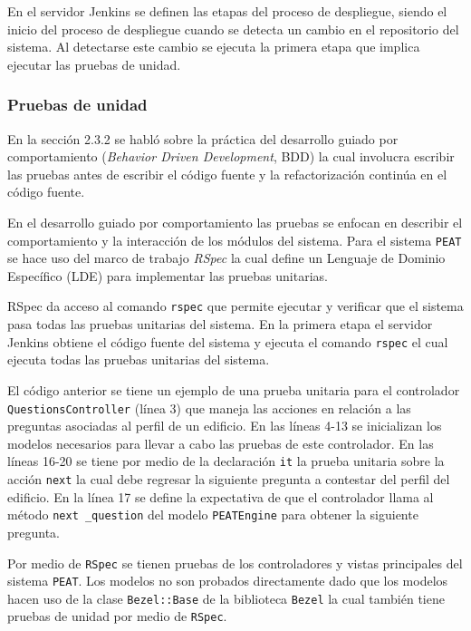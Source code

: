 En el servidor Jenkins se definen las etapas del proceso de despliegue, siendo
el inicio del proceso de despliegue cuando se detecta un cambio en el repositorio
del sistema. Al detectarse este cambio se ejecuta la primera etapa que implica
ejecutar las pruebas de unidad.

\subsubsection{Pruebas de unidad}

En la sección 2.3.2 se habló sobre la práctica del desarrollo guiado por
comportamiento (\textit{Behavior Driven Development}, BDD) la cual involucra
escribir las pruebas antes de escribir el código fuente y la refactorización
continúa en el código fuente.

En el desarrollo guiado por comportamiento las pruebas se enfocan en describir el
comportamiento y la interacción de los módulos del sistema. Para el sistema
\texttt{PEAT} se hace uso del marco de trabajo \textit{RSpec} la cual define un
Lenguaje de Dominio Específico (LDE) para implementar las pruebas unitarias.

RSpec da acceso al comando \texttt{rspec} que permite ejecutar y verificar
que el sistema pasa todas las pruebas unitarias del sistema. En la primera
etapa el servidor Jenkins obtiene el código fuente del sistema y ejecuta el
comando \texttt{rspec} el cual ejecuta todas las pruebas unitarias del sistema.



El código anterior se tiene un ejemplo de una prueba unitaria para el controlador
\texttt{QuestionsController} (línea 3) que maneja las acciones en relación
a las preguntas asociadas al perfil de un edificio. En las líneas 4-13 se
inicializan los modelos necesarios para llevar a cabo las pruebas de este
controlador.
En las líneas 16-20 se tiene por medio de la declaración \texttt{it} la
prueba unitaria sobre la acción \texttt{next} la cual debe regresar
la siguiente pregunta a contestar del perfil del edificio. En la línea
17 se define la expectativa de que el controlador llama al método \texttt{next
  \_question} del modelo \texttt{PEATEngine} para obtener la siguiente pregunta.

Por medio de \texttt{RSpec} se tienen pruebas de los controladores y vistas
principales del sistema \texttt{PEAT}. Los modelos no son probados directamente
dado que los modelos hacen uso de la clase \texttt{Bezel::Base} de la biblioteca
\texttt{Bezel} la cual también tiene pruebas de unidad por medio de \texttt{RSpec}.

